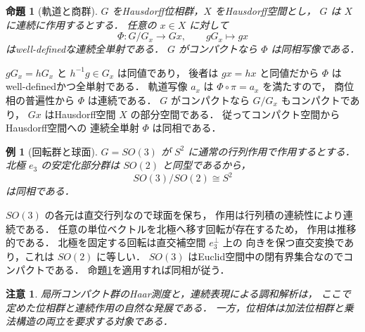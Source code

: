\documentclass[a5paper,10pt,onecolumn]{jsarticle}
\makeatletter
\theoremstyle{mathnotetheorem}
\newtheorem{proposition}[theorem]{命題}
\newtheorem{example}[theorem]{例}
\newtheorem{remark}[theorem]{注意}
\renewcommand{\proofname}{証明}
\renewenvironment{proof}[1][\proofname]{%
  \par\pushQED{\qed}\normalfont\topsep4\p@\@plus2\p@\relax
  \trivlist\item[\hskip\labelsep\bfseries #1]\ignorespaces
}{\popQED\endtrivlist\@endpefalse}
\makeatother
\begin{document}
\begin{proposition}[軌道と商群]\label{prop:orbit}
$G$ をHausdorff位相群，$X$ をHausdorff空間とし，
$G$ は $X$ に連続に作用するとする．
任意の $x\in X$ に対して
\[
 \Phi:G/G_x\longrightarrow Gx,\qquad gG_x\longmapsto gx
\]
はwell-definedな連続全単射である．
$G$ がコンパクトなら $\Phi$ は同相写像である．
\end{proposition}
\begin{proof}
$gG_x=hG_x$ と $h^{-1}g\in G_x$ は同値であり，
後者は $gx=hx$ と同値だから
$\Phi$ はwell-definedかつ全単射である．
軌道写像 $a_x$ は
$\Phi\circ\pi=a_x$ を満たすので，
商位相の普遍性から $\Phi$ は連続である．
$G$ がコンパクトなら $G/G_x$ もコンパクトであり，
$Gx$ はHausdorff空間 $X$ の部分空間である．
従ってコンパクト空間からHausdorff空間への
連続全単射 $\Phi$ は同相である．
\end{proof}

\begin{example}[回転群と球面]
$G=SO(3)$ が $S^2$ に通常の行列作用で作用するとする．
北極 $e_3$ の安定化部分群は $SO(2)$ と同型であるから，
\[
 SO(3)/SO(2)\cong S^2
\]
は同相である．
\end{example}
\begin{proof}
$SO(3)$ の各元は直交行列なので球面を保ち，
作用は行列積の連続性により連続である．
任意の単位ベクトルを北極へ移す回転が存在するため，
作用は推移的である．
北極を固定する回転は直交補空間 $e_3^\perp$ 上の
向きを保つ直交変換であり，これは $SO(2)$ に等しい．
$SO(3)$ はEuclid空間中の閉有界集合なのでコンパクトである．
命題\ref{prop:orbit}を適用すれば同相が従う．
\end{proof}

\begin{remark}
局所コンパクト群のHaar測度と，連続表現による調和解析は，
ここで定めた位相群と連続作用の自然な発展である．
一方，位相体は加法位相群と乗法構造の両立を要求する対象である．
\end{remark}
\end{document}
